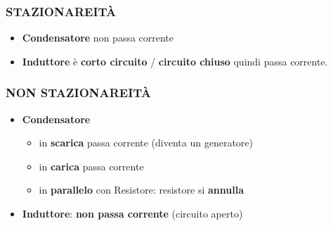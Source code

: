 \documentclass{article}
\begin{document}

\pagebreak

\subsubsection{STAZIONAREITÀ}
\begin{itemize}
  \item \textbf{Condensatore} non passa corrente
  \item \textbf{Induttore} è \textbf{corto circuito} / \textbf{circuito chiuso} quindi passa corrente.
\end{itemize}
\subsubsection{NON STAZIONAREITÀ}
\begin{itemize}
  \item \textbf{Condensatore} 
  \begin{itemize}
    \item in \textbf{scarica} passa corrente (diventa un generatore)
    \item in \textbf{carica} passa corrente
    \item in \textbf{parallelo} con Resistore: resistore si \textbf{annulla}
  \end{itemize}
  \item \textbf{Induttore}: \textbf{non passa corrente} (circuito aperto) 
\end{itemize}
\end{document}
